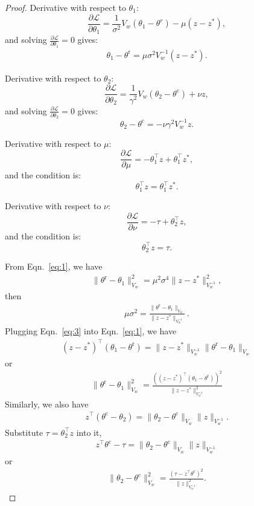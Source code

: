 \documentclass[accepted]{uai2025} %
\theoremstyle{plain}
\theoremstyle{definition}
\theoremstyle{remark}
\newcommand{\thetac}{\theta^{\mathrm{c}}}
\newcommand{\thetar}{\theta^{\mathrm{r}}}
\begin{document}
\begin{proof}
Derivative with respect to \(\theta_1\):
\[
\frac{\partial \mathcal{L}}{\partial \theta_1} = \frac{1}{\sigma^2} V_w (\theta_1 - \theta^r) - \mu (z - z^*),
\]
and solving $\frac{\partial \mathcal{L}}{\partial \theta_1}=0$ gives:
\begin{align}
\label{eq:1}
    \theta_1 - \thetar = {\mu}{\sigma^2} V_w^{-1} (z - z^*).
\end{align}



Derivative with respect to \(\theta_2\):
\[
\frac{\partial \mathcal{L}}{\partial \theta_2} = \frac{1}{\gamma^2} V_w (\theta_2 - \thetac) + \nu z,
\]
and solving $\frac{\partial \mathcal{L}}{\partial \theta_2}=0$ gives:
\[
\theta_2 - \thetac =- {\nu}{\gamma^2} V_w^{-1} z.
\]

Derivative with respect to \(\mu\):
\[
\frac{\partial \mathcal{L}}{\partial \mu} = -\theta_1^\top z + \theta_1^\top z^*,
\]
and the condition is:
\[
\theta_1^\top z = \theta_1^\top z^*.
\]

Derivative with respect to \(\nu\):
\[
\frac{\partial \mathcal{L}}{\partial \nu} = -\tau + \theta_2^\top z,
\]
and the condition is:
\[
\theta_2^\top z = \tau.
\]

From Eqn.~\eqref{eq:1},   we have
\begin{align*}
    \lVert\thetar-\theta_1\rVert^2_{V_w}={\mu^2}{\sigma^4}\lVert z-z^* \rVert^2_{V_w^{-1}},
\end{align*}
then
\begin{align}
\label{eq:3}
    {\mu}{\sigma^2}=\frac{\lVert\thetar-\theta_1\rVert_{V_w}}{\lVert z-z^* \rVert_{V_w^{-1}}}~.
\end{align}
Plugging  Eqn.~\eqref{eq:3} into Eqn.~\eqref{eq:1},  we have
\begin{align*}
    (z-z^*)^\top (\theta_1-\thetar)=\lVert z-z^* \rVert_{V_w^{-1}} \lVert\thetar-\theta_1\rVert_{V_w}
\end{align*}
or
\begin{align}
\label{eq:13}
    \lVert\thetar-\theta_1\rVert^2_{V_w}=\frac{((z-z^*)^\top (\theta_1-\thetar))^2}{\lVert z-z^* \rVert^2_{V_w^{-1}}}
\end{align}
Similarly, we   also have
\begin{align*}
    z^\top (\thetac-\theta_2)=\lVert\theta_2-\thetac \rVert_{V_w} \lVert z \rVert_{V_w^{-1}}.\nonumber
\end{align*}
Substitute $\tau=\theta_2^\top z$ into it,
\begin{align}
    z^\top \thetac-\tau=\lVert\theta_2-\thetac \rVert_{V_w} \lVert z \rVert_{V_w^{-1}}\nonumber
\end{align}
or
\begin{align}
\label{eq:16}
    \lVert\theta_2-\thetac \rVert^2_{V_w}=\frac{(\tau-z^\top \thetac)^2}{\lVert z \rVert^2_{V_w^{-1}}}.
\end{align}


\end{proof}
\end{document}
